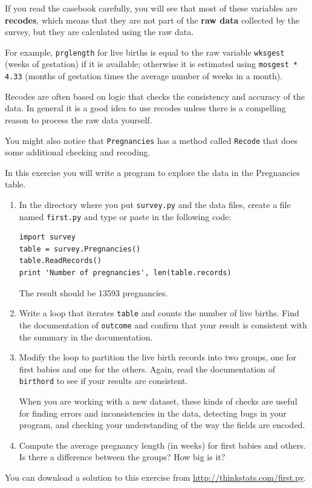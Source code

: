 \documentclass[12pt]{book}
\begin{document}
If you read the casebook carefully, you will see that most of these
variables are {\bf recodes}, which means that they are not part
of the {\bf raw data} collected by the survey, but they are
calculated using the raw data.

For example, {\tt prglength} for live births is equal to the raw
variable {\tt wksgest} (weeks of gestation) if it is available;
otherwise it is estimated using {\tt mosgest * 4.33} (months of
gestation times the average number of weeks in a month).

Recodes are often based on logic that checks the consistency and
accuracy of the data.  In general it is a good idea to use recodes
unless there is a compelling reason to process the raw data
yourself.

You might also notice that {\tt Pregnancies} has a method called
{\tt Recode} that does some additional checking and recoding.

\begin{exercise}
In this exercise you will write a program to explore the data
in the Pregnancies table.

\begin{enumerate}

\item In the directory where you put {\tt survey.py} and the
data files, create a file named \verb"first.py" and
type or paste in the following code:
%
\begin{verbatim}
import survey
table = survey.Pregnancies()
table.ReadRecords()
print 'Number of pregnancies', len(table.records)
\end{verbatim}

The result should be 13593 pregnancies.

\item Write a loop that iterates \verb"table" and counts
the number of live births.  Find the documentation of {\tt outcome}
and confirm that your result is consistent with the summary
in the documentation.

\item Modify the loop to partition the live birth records into
two groups, one for first babies and one for the others.  Again,
read the documentation of {\tt birthord} to see if your results
are consistent.

When you are working with a new dataset, these kinds of checks
are useful for finding errors and inconsistencies in the data,
detecting bugs in your program, and checking your understanding
of the way the fields are encoded.

\item Compute the average pregnancy length (in weeks) for first
babies and others.  Is there a difference between the groups?  How
big is it?

\end{enumerate}

You can download a solution to this exercise from
\url{http://thinkstats.com/first.py}.

\end{exercise}
\end{document}
